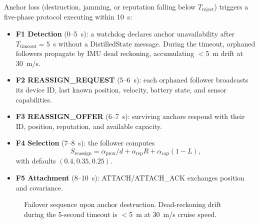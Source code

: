 \documentclass[conference,10pt]{IEEEtran}
\begin{document}
Anchor loss (destruction, jamming, or reputation falling below $T_\text{reject}$) triggers a five-phase protocol executing within 10~s:
\begin{itemize}
    \item \textbf{F1 Detection} (0--5~s): a watchdog declares anchor unavailability after $T_\text{timeout} = 5$~s without a DistilledState message. During the timeout, orphaned followers propagate by IMU dead reckoning, accumulating $<$5~m drift at 30~m/s.
    \item \textbf{F2 REASSIGN\_REQUEST} (5--6~s): each orphaned follower broadcasts its device ID, last known position, velocity, battery state, and sensor capabilities.
    \item \textbf{F3 REASSIGN\_OFFER} (6--7~s): surviving anchors respond with their ID, position, reputation, and available capacity.
    \item \textbf{F4 Selection} (7--8~s): the follower computes
    \begin{equation}
    S_\text{reassign} = \alpha_\text{prox}/d + \alpha_\text{rep} R + \alpha_\text{cap}(1 - L),
    \label{eq:reassign}
    \end{equation}
    with defaults $(0.4, 0.35, 0.25)$.
    \item \textbf{F5 Attachment} (8--10~s): ATTACH/ATTACH\_ACK exchanges position and covariance.
\end{itemize}
\begin{figure}[t]
\centering
{}
\caption{Failover sequence upon anchor destruction. Dead-reckoning drift during the 5-second timeout is $<$5~m at 30~m/s cruise speed.}
\label{fig:failover}
\end{figure}
\end{document}
